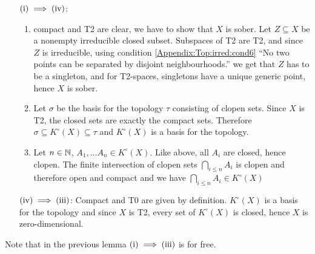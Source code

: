 {\begin{enumerate}[leftmargin=2cm]
        \item[$(\romanNum{1})\implies (\romanNum{4})$:] 
        \begin{enumerate}
            \item compact and T2 are clear, we have to show that $X$ is sober.
            Let $Z\subseteq X$ be a nonempty irreducible closed subset. Subspaces of T2 are T2, and 
            since $Z$ is irreducible, using condition \ref{Appendix:Top:irred:cond6}
            ``No two points can be separated by disjoint neighbourhoods.'' we get that $Z$ has to be a singleton, and for T2-spaces, singletons have a unique generic point, hence $X$ is sober.
            \item Let $\sigma$ be the basis for the topology $\tau$ consisting of clopen sets. Since $X$ is T2, the closed sets are exactly the compact sets. Therefore
            $\sigma\subseteq K^\circ(X)\subseteq \tau$ and $K^\circ(X)$ is a basis for the topology.
            \item Let $n\in \mathbb{N}$, $A_1,\dots A_n\in K^\circ(X)$. Like above, all $A_i$ are closed, hence
            clopen. The finite intersection of clopen sets $\bigcap_{i\leq n}A_i$ is clopen and therefore open and compact and we have $\bigcap_{i\leq n}A_i\in K^\circ(X)$
        \end{enumerate}
        \item[$(\romanNum{4})\implies (\romanNum{3})$:]
        Compact and T0 are given by definition. $K^\circ(X)$ is a basis for the topology and since $X$ is T2, every set of $K^\circ(X)$ is closed, hence $X$ is zero-dimensional.
    \end{enumerate}
    \vspace{-0.7cm}
}
Note that in the previous lemma $(\romanNum{1})\implies (\romanNum{3})$ is for free.

